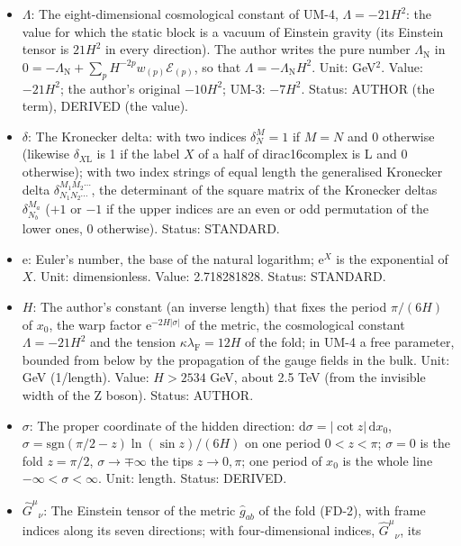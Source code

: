 \documentclass[
  10pt,
]{article}
\begin{document}
\begin{itemize}
\item
  \(\Lambda\): The eight-dimensional cosmological constant of UM-4,
  \(\Lambda = -21H^2\): the value for which the static block is a vacuum
  of Einstein gravity (its Einstein tensor is \(21H^2\) in every
  direction). The author writes the pure number \(\Lambda_{\mathrm{N}}\)
  in
  \(0 = -\Lambda_{\mathrm{N}} + \sum_p H^{-2p}w_{(p)}\mathcal{E}_{(p)}\),
  so that \(\Lambda = -\Lambda_{\mathrm{N}}H^2\). Unit: GeV\(^2\).
  Value: \(-21H^2\); the author's original \(-10H^2\); UM-3: \(-7H^2\).
  Status: AUTHOR (the term), DERIVED (the value).
\item
  \(\delta\): The Kronecker delta: with two indices \(\delta^M_N = 1\)
  if \(M = N\) and 0 otherwise (likewise \(\delta_{X\mathrm{L}}\) is 1
  if the label \(X\) of a half of dirac16complex is L and 0 otherwise);
  with two index strings of equal length the generalised Kronecker delta
  \(\delta^{M_1M_2\cdots}_{N_1N_2\cdots}\), the determinant of the
  square matrix of the Kronecker deltas \(\delta^{M_a}_{N_b}\) (\(+1\)
  or \(-1\) if the upper indices are an even or odd permutation of the
  lower ones, 0 otherwise). Status: STANDARD.
\item
  \(\mathrm{e}\): Euler's number, the base of the natural logarithm;
  \(\mathrm{e}^{X}\) is the exponential of \(X\). Unit: dimensionless.
  Value: 2.718281828. Status: STANDARD.
\item
  \(H\): The author's constant (an inverse length) that fixes the period
  \(\pi/(6H)\) of \(x_0\), the warp factor
  \(\mathrm{e}^{-2H\lvert\sigma\rvert}\) of the metric, the cosmological
  constant \(\Lambda = -21H^2\) and the tension
  \(\kappa\lambda_{\mathrm{F}} = 12H\) of the fold; in UM-4 a free
  parameter, bounded from below by the propagation of the gauge fields
  in the bulk. Unit: GeV (1/length). Value: \(H > 2534\) GeV, about 2.5
  TeV (from the invisible width of the Z boson). Status: AUTHOR.
\item
  \(\sigma\): The proper coordinate of the hidden direction:
  \(\mathrm{d}\sigma = \lvert\cot z\rvert\,\mathrm{d}x_0\),
  \(\sigma = \mathrm{sgn}(\pi/2 - z)\ln(\sin z)/(6H)\) on one period
  \(0 < z < \pi\); \(\sigma = 0\) is the fold \(z = \pi/2\),
  \(\sigma \to \mp\infty\) the tips \(z \to 0, \pi\); one period of
  \(x_0\) is the whole line \(-\infty < \sigma < \infty\). Unit: length.
  Status: DERIVED.
\item
  \(\hat G^\mu{}_\nu\): The Einstein tensor of the metric
  \(\hat g_{ab}\) of the fold (FD-2), with frame indices along its seven
  directions; with four-dimensional indices, \(\hat G^\mu{}_\nu\), its

\end{itemize}
\end{document}
